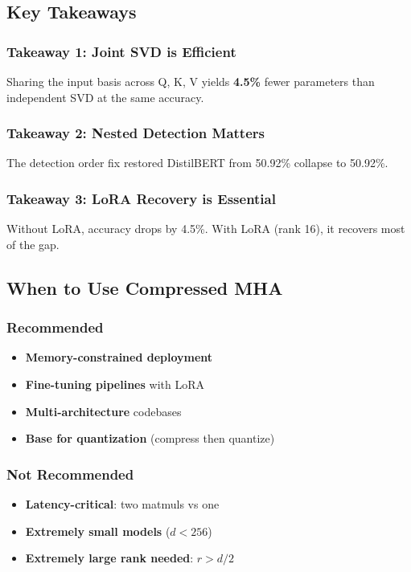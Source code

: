 \subsection{Key Takeaways}

\subsubsection{Takeaway 1: Joint SVD is Efficient}

Sharing the input basis across Q, K, V yields \textbf{4.5\%} fewer 
parameters than independent SVD at the same accuracy.

\subsubsection{Takeaway 2: Nested Detection Matters}

The detection order fix restored DistilBERT from 50.92\% collapse to 
50.92\%.

\subsubsection{Takeaway 3: LoRA Recovery is Essential}

Without LoRA, accuracy drops by 4.5\%. With LoRA (rank 16), it 
recovers most of the gap.

\subsection{When to Use Compressed MHA}

\subsubsection{Recommended}
\begin{itemize}
\item \textbf{Memory-constrained deployment}
\item \textbf{Fine-tuning pipelines} with LoRA
\item \textbf{Multi-architecture} codebases
\item \textbf{Base for quantization} (compress then quantize)

\end{itemize}
\subsubsection{Not Recommended}
\begin{itemize}
\item \textbf{Latency-critical}: two matmuls vs one
\item \textbf{Extremely small models} ($d < 256$)
\item \textbf{Extremely large rank needed}: $r > d/2$

\end{itemize}
